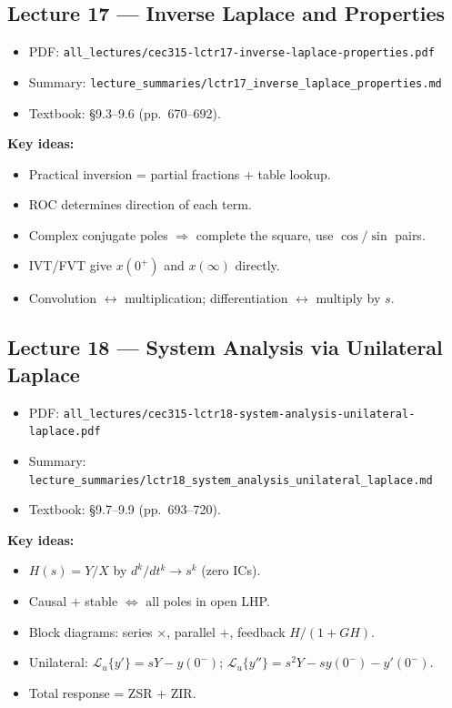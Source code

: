 \documentclass[11pt]{article}
\begin{document}
\subsection{Lecture 17 --- Inverse Laplace and Properties}
\begin{itemize}[leftmargin=*]
  \item PDF: \texttt{all\_lectures/cec315-lctr17-inverse-laplace-properties.pdf}
  \item Summary: \texttt{lecture\_summaries/lctr17\_inverse\_laplace\_properties.md}
  \item Textbook: \S 9.3--9.6 (pp.~670--692).
\end{itemize}
\textbf{Key ideas:}
\begin{itemize}[leftmargin=*]
  \item Practical inversion = partial fractions + table lookup.
  \item ROC determines direction of each term.
  \item Complex conjugate poles $\Rightarrow$ complete the square, use $\cos/\sin$ pairs.
  \item IVT/FVT give $x(0^+)$ and $x(\infty)$ directly.
  \item Convolution $\leftrightarrow$ multiplication; differentiation $\leftrightarrow$ multiply by $s$.
\end{itemize}

\subsection{Lecture 18 --- System Analysis via Unilateral Laplace}
\begin{itemize}[leftmargin=*]
  \item PDF: \texttt{all\_lectures/cec315-lctr18-system-analysis-unilateral-laplace.pdf}
  \item Summary: \texttt{lecture\_summaries/lctr18\_system\_analysis\_unilateral\_laplace.md}
  \item Textbook: \S 9.7--9.9 (pp.~693--720).
\end{itemize}
\textbf{Key ideas:}
\begin{itemize}[leftmargin=*]
  \item $H(s) = Y/X$ by $d^k/dt^k \to s^k$ (zero ICs).
  \item Causal + stable $\Leftrightarrow$ all poles in open LHP.
  \item Block diagrams: series $\times$, parallel $+$, feedback $H/(1+GH)$.
  \item Unilateral: $\mathcal{L}_u\{y'\} = sY - y(0^-)$; $\mathcal{L}_u\{y''\} = s^2Y - sy(0^-) - y'(0^-)$.
  \item Total response = ZSR + ZIR.
\end{itemize}
\end{document}
